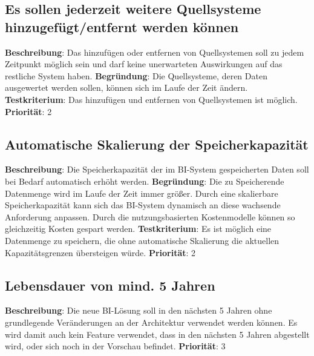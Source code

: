 \subsection[Hinzufügen/Entfernen von Quellsystemen]{Es sollen jederzeit weitere Quellsysteme hinzugefügt/entfernt werden können} \label{sec:anforderungsspezifikation:QuellsystemeÄndern}
\textbf{Beschreibung}: Das hinzufügen oder entfernen von Quellsystemen soll zu jedem Zeitpunkt möglich sein und darf keine unerwarteten Auswirkungen auf das restliche System haben.
\newline \textbf{Begründung}: Die Quellsysteme, deren Daten ausgewertet werden sollen, können sich im Laufe der Zeit ändern.
\newline \textbf{Testkriterium}: Das hinzufügen und entfernen von Quellsystemen ist möglich.
\newline \textbf{Priorität}: 2

\subsection{Automatische Skalierung der Speicherkapazität} \label{sec:anforderungsspezifikation:skalierungDerSpeicherkapazität}
\textbf{Beschreibung}: Die Speicherkapazität der im BI-System gespeicherten Daten soll bei Bedarf automatisch erhöht werden.
\newline \textbf{Begründung}: Die zu Speicherende Datenmenge wird im Laufe der Zeit immer größer. Durch eine skalierbare Speicherkapazität kann sich das BI-System dynamisch an diese wachsende Anforderung anpassen. Durch die nutzungsbasierten Kostenmodelle können so gleichzeitig Kosten gespart werden.
\newline \textbf{Testkriterium}: Es ist möglich eine Datenmenge zu speichern, die ohne automatische Skalierung die aktuellen Kapazitätsgrenzen übersteigen würde.
\newline \textbf{Priorität}: 2

\subsection{Lebensdauer von mind. 5 Jahren} \label{sec:anforderungsspezifikation:langlebigkeit}
\textbf{Beschreibung}: Die neue BI-Lösung soll in den nächsten 5 Jahren ohne grundlegende Veränderungen an der Architektur verwendet werden können. Es wird damit auch kein Feature verwendet, dass in den nächsten 5 Jahren abgestellt wird, oder sich noch in der Vorschau befindet.
\newline \textbf{Priorität}: 3

